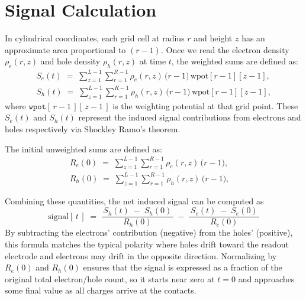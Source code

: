 \section{Signal Calculation}
In cylindrical coordinates, each grid cell at radius $r$ and height $z$ has an approximate area proportional to $(r - 1)$. Once we read the electron 
density $\rho_e(r,z)$ and hole density $\rho_h(r,z)$ at time $t$, the weighted sums are defined as:
\begin{align}
S_e(t) \;=\; \sum_{z=1}^{L-1} \sum_{r=1}^{R-1}
   \rho_e(r,z)\,\bigl(r-1\bigr)\,\text{wpot}[r-1][z-1],\\
S_h(t) \;=\; \sum_{z=1}^{L-1} \sum_{r=1}^{R-1}
   \rho_h(r,z)\,\bigl(r-1\bigr)\,\text{wpot}[r-1][z-1],
\end{align}
where \(\texttt{wpot}[\,r-1\,][\,z-1\,]\) is the weighting potential at that grid 
point. These $S_e(t)$ and $S_h(t)$ represent the induced signal contributions 
from electrons and holes respectively via Shockley Ramo’s theorem.

The initial unweighted sums are defined as:
\begin{align}
R_{e}(0) \;=\; \sum_{z=1}^{L-1} \sum_{r=1}^{R-1}
   \rho_e(r,z)\,\bigl(r-1\bigr), \quad \\
R_{h}(0) \;=\; \sum_{z=1}^{L-1} \sum_{r=1}^{R-1}
   \rho_h(r,z)\,\bigl(r-1\bigr), \quad
\end{align}

Combining these quantities, the net induced signal can be computed as
\begin{equation}
\text{signal}[\,t\,] 
\;=\;
  \frac{\,S_h(t)\;-\;S_h(0)\,}{\,R_{h}(0)\,}
  \;-\;
  \frac{\,S_e(t)\;-\;S_e(0)\,}{\,R_{e}(0)\,}
\label{eq:net-signal}
\end{equation}
By subtracting the electrons’ contribution 
(negative) from the holes’ (positive), this formula matches the typical polarity 
where holes drift toward the readout electrode and electrons may drift in the 
opposite direction. Normalizing by $R_{e}(0)$ and $R_{h}(0)$ ensures that the 
signal is expressed as a fraction of the original total electron/hole count, 
so it starts near zero at $t=0$ and approaches some final value as all charges 
arrive at the contacts.



